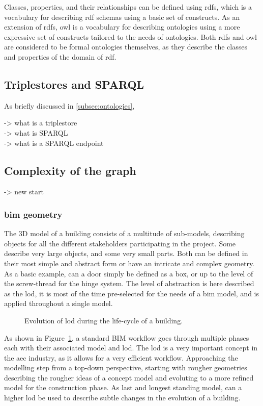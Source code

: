 Classes, properties, and their relationships can be defined using \ac{rdfs}, which is a vocabulary for describing \ac{rdf} schemas using a basic set of constructs. As an extension of \ac{rdfs}, \ac{owl} is a vocabulary for describing ontologies using a more expressive set of constructs tailored to the needs of ontologies. Both \ac{rdfs} and \ac{owl} are considered to be formal ontologies themselves, as they describe the classes and properties of the domain of \ac{rdf}.

\subsection{Triplestores and SPARQL}
As briefly discussed in \ref{subsec:ontologies}, 

-> what is a triplestore\\
-> what is SPARQL\\
-> what is a SPARQL endpoint

\subsection{Complexity of the graph}
-> new start
\subsubsection{\ac{bim} geometry} \label{subsec:bimGeometry}
The 3D model of a building consists of a multitude of sub-models, describing objects for all the different stakeholders participating in the project. Some describe very large objects, and some very small parts. Both can be defined in their most simple and abstract form or have an intricate and complex geometry. As a basic example, can a door simply be defined as a box, or up to the level of the screw-thread for the hinge system. The level of abstraction is here described as the \ac{lod}, it is most of the time pre-selected for the needs of a \ac{bim} model, and is applied throughout a single model.

\begin{figure}[h]
	\centering
	
	\caption{Evolution of \acs{lod} during the life-cycle of a building.}
	\label{fig:bimGraph}
\end{figure}

As shown in Figure~\ref{fig:bimGraph}, a standard BIM workflow goes through multiple phases each with their associated model and \ac{lod}. The \ac{lod} is a very important concept in the \ac{aec} industry, as it allows for a very efficient workflow. Approaching the modelling step from a top-down perspective, starting with rougher geometries describing the rougher ideas of a concept model and evoluting to a more refined model for the construction phase. As last and longest standing model, can a higher \ac{lod} be used to describe subtle changes in the evolution of a building.

